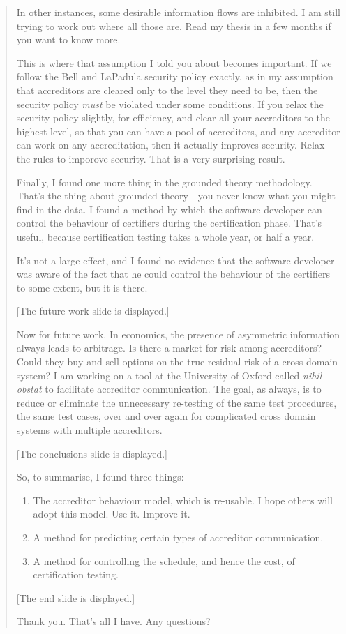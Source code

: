 \begin{quotation}
In other instances, some desirable information flows are inhibited.  I am still trying to work out
where all those are.  Read my thesis in a few months if you want to know more.

This is where that assumption I told you about becomes important.  If we follow the Bell and
LaPadula security policy exactly, as in my assumption that accreditors are cleared only to the
level they need to be, then the security policy \emph{must} be violated under some conditions.  If
you relax the security policy slightly, for efficiency, and clear all your accreditors to the
highest level, so that you can have a pool of accreditors, and any accreditor can work on any
accreditation, then it actually improves security.  Relax the rules to imporove security.  That is
a very surprising result.

Finally, I found one more thing in the grounded theory methodology.  That's the thing about
grounded theory---you never know what you might find in the data.  I found a method by which the
software developer can control the behaviour of certifiers during the certification phase.  That's
useful, because certification testing takes a whole year, or half a year.

It's not a large effect, and I found no evidence that the software developer was aware of the fact
that he could control the behaviour of the certifiers to some extent, but it is there.

[The future work slide is displayed.]

Now for future work.  In economics, the presence of asymmetric information always leads to
arbitrage.  Is there a market for risk among accreditors?  Could they buy and sell options on the
true residual risk of a cross domain system?  I am working on a tool at the University of Oxford
called \emph{nihil obstat} to facilitate accreditor communication.  The goal, as always, is to
reduce or eliminate the unnecessary re-testing of the same test procedures, the same test cases,
over and over again for complicated cross domain systems with multiple accreditors.

[The conclusions slide is displayed.]

So, to summarise, I found three things:

\begin{enumerate}
	\item The accreditor behaviour model, which is re-usable.  I hope others will adopt this model.
		Use it.  Improve it.
	\item A method for predicting certain types of accreditor communication.
	\item A method for controlling the schedule, and hence the cost, of certification testing.
\end{enumerate}

[The end slide is displayed.]

Thank you.  That's all I have.  Any questions?
\end{quotation}

